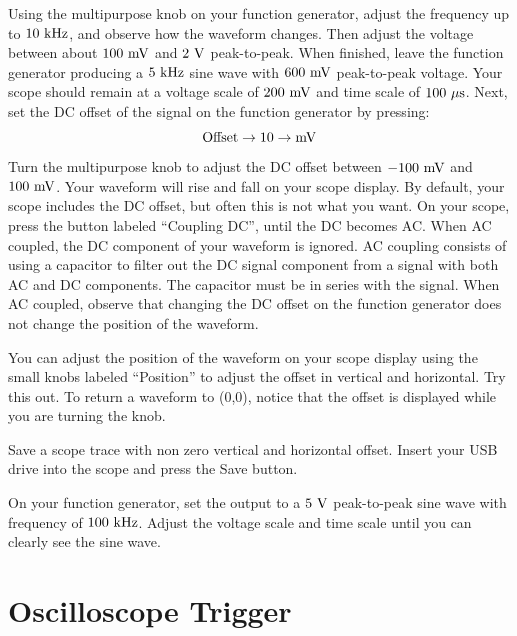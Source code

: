 Using the multipurpose knob on your function generator, adjust the
frequency up to $10~\rm kHz$, and observe how the waveform changes.
Then adjust the voltage between about $100~\rm mV$ and $2~\rm V$
peak-to-peak.  When finished, leave the function generator producing a
$5~\rm kHz$ sine wave with $600~\rm mV$ peak-to-peak voltage.  Your
scope should remain at a voltage scale of $200~\rm mV$ and time scale
of $100~\rm \mu s$.  Next, set the DC offset of the signal on the function generator by pressing:
\begin{displaymath}
{\rm Offset \to 10 \to mV}
\end{displaymath}
Turn the multipurpose knob to adjust the DC offset between $-100~\rm
mV$ and $100~\rm mV$.  Your waveform will rise and fall on your scope
display.  By default, your scope includes the DC offset, but often this
is not what you want.  On your scope, press the button labeled
``Coupling DC'', until the DC becomes AC.  When AC coupled, the DC
component of your waveform is ignored.  AC coupling consists of using a capacitor to filter out the DC signal component from a signal with both AC and DC components. The capacitor must be in series with the signal. When AC coupled, observe that
changing the DC offset on the function generator does not change the
position of the waveform.

You can adjust the position of the waveform on your scope display using the small knobs
labeled ``Position'' to adjust the offset in vertical and horizontal.
Try this out.  To return a waveform to (0,0), notice that the offset is displayed while you are turning the knob.

\begin{plot} Save a scope trace with non zero vertical and horizontal offset. Insert your USB drive into the scope and press the Save button. 
\end{plot}

On your function generator, set the output to a $5~\rm V$ peak-to-peak
sine wave with frequency of $100~\rm kHz$.  Adjust the voltage scale
and time scale until you can clearly see the sine wave.

\section{Oscilloscope Trigger}

